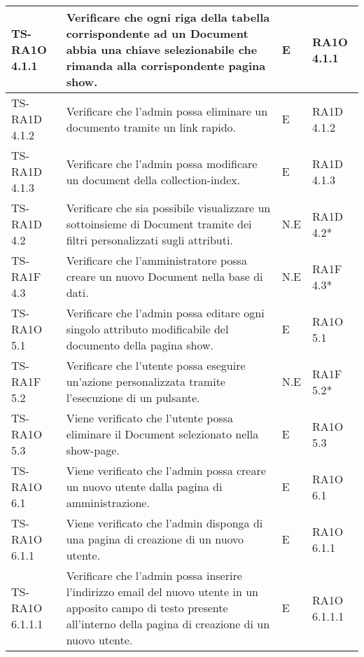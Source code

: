\begin{center}
\begin{longtable}{| p{3cm} | p{6cm} | p{1.5cm} | p{2cm} | }
				TS-RA1O 4.1.1 & 
				Verificare che ogni riga della tabella corrispondente ad un Document abbia una chiave selezionabile che rimanda alla corrispondente pagina show.
 & E & RA1O 4.1.1 \newline  \\ \hline 
				TS-RA1D 4.1.2 & 
				Verificare che l'admin possa eliminare un documento tramite un link rapido. & E & RA1D 4.1.2 \newline  \\ \hline 
				TS-RA1D 4.1.3 & 
				Verificare che l'admin possa modificare un document della collection-index.
 & E & RA1D 4.1.3 \newline  \\ \hline 
				TS-RA1D 4.2 & 
				Verificare che sia possibile visualizzare un sottoinsieme di Document tramite dei filtri personalizzati sugli attributi. & N.E & RA1D 4.2*  \newline  \\ \hline 
				TS-RA1F 4.3 & 
				Verificare che l'amministratore possa creare un nuovo Document nella base di dati. & N.E & RA1F 4.3*  \newline  \\ \hline 
				TS-RA1O 5.1 & 
				Verificare che l'admin possa editare ogni singolo attributo modificabile del documento della pagina show. & E & RA1O 5.1 \newline  \\ \hline 
				TS-RA1F 5.2 & 
				Verificare che l'utente possa eseguire un'azione personalizzata tramite l'esecuzione di un pulsante. & N.E & RA1F 5.2*  \newline  \\ \hline 
				TS-RA1O 5.3 & 
				Viene verificato che l'utente possa eliminare il Document selezionato nella show-page. & E & RA1O 5.3 \newline  \\ \hline 
				TS-RA1O 6.1 & 
				Viene verificato che l'admin possa creare un nuovo utente dalla pagina di amministrazione. & E & RA1O 6.1 \newline  \\ \hline 
				TS-RA1O 6.1.1 & 
				Viene verificato che l'admin disponga di una pagina di creazione di un nuovo utente. & E & RA1O 6.1.1 \newline  \\ \hline 
				TS-RA1O 6.1.1.1 & 
				Verificare che l'admin possa inserire l'indirizzo email del nuovo utente in un apposito campo di testo presente all'interno della pagina di creazione di un nuovo utente. & E & RA1O 6.1.1.1 \newline  \\ \hline 

\end{longtable}
\end{center}
